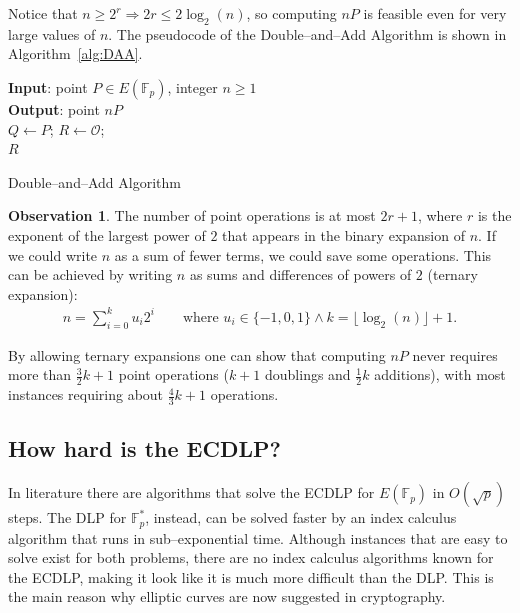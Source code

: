 \documentclass[9pt]{article}
\theoremstyle{definition}
\newtheorem*{observation}{Observation}
\begin{document}
Notice that $n \geq 2^r \Longrightarrow 2r \leq 2\log_2(n)$, so computing $n P$ is feasible even for very large values of $n$. The pseudocode of the Double--and--Add Algorithm is shown in Algorithm~\ref{alg:DAA}.

\begin{algorithm}[H]
	\SetAlgoLined
	\textbf{Input}: point $P \in E(\mathbb{F}_p)$, integer $n \geq 1$ \\
	\textbf{Output}: point $n P$ \\ 
	$Q \gets P$; $R \gets \mathcal{O}$; \\
	\Return $R$
	\caption{Double--and--Add Algorithm}
	\label{alg:DAA}
\end{algorithm}

\begin{observation}
    The number of point operations is at most $2r + 1$, where $r$ is the exponent of the largest power of $2$ that appears in the binary expansion of $n$. If we could write $n$ as a sum of fewer terms, we could save some operations. This can be achieved by writing $n$ as sums and differences of powers of $2$ (ternary expansion):
    \begin{align*}
        n = \sum_{i = 0}^{k}u_i 2^i \qquad \text{where } u_i \in \{-1,0,1\} \wedge k = \lfloor\log_2(n)\rfloor+1.
    \end{align*}
    
    By allowing ternary expansions one can show that computing $nP$ never requires more than $\frac{3}{2}k + 1$ point operations ($k + 1$ doublings and $\frac{1}{2}k$ additions), with most instances requiring about $\frac{4}{3}k + 1$ operations.
\end{observation}

\subsection{How hard is the ECDLP?}
In literature there are algorithms that solve the ECDLP for $E(\mathbb{F}_p)$ in $O(\sqrt{p})$ steps. The DLP for $\mathbb{F}_p^\ast$, instead, can be solved faster by an index calculus algorithm that runs in sub--exponential time.
Although instances that are easy to solve exist for both problems, there are no index calculus algorithms known for the ECDLP, making it look like it is much more difficult than the DLP. This is the main reason why elliptic curves are now suggested in cryptography.
\end{document}
